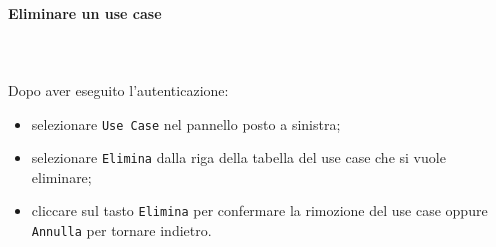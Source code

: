 \paragraph{Eliminare un use case} \mbox{}\\ \mbox{}\\
Dopo aver eseguito l'autenticazione:
\begin{itemize}
	\item selezionare \texttt{Use Case} nel pannello posto a sinistra;
	\item selezionare \texttt{Elimina} dalla riga della tabella del use case 
		che si vuole eliminare;\
	\item cliccare sul tasto \texttt{Elimina} per confermare la rimozione del use case
		oppure \texttt{Annulla} per tornare indietro.
\end{itemize}


